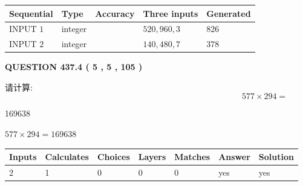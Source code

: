 \documentclass{ctexart}
\begin{document}
   
  
  
\noindent\begin{tabular}{|l|l|l|l|l|}
\hline
 Sequential & Type & Accuracy & Three inputs & Generated \\ 
\hline
 
 
  INPUT $  1 $ & integer &  & $
 520
 , 
 960
 , 
 3
 $ & $ 826 $ 
 \\  \hline  
 
 
  INPUT $  2 $ & integer &  & $
 140
 , 
 480
 , 
 7
 $ & $ 378 $ 
 \\  \hline  
 \end{tabular}
   
   
  
\vspace{0.2in}
  
{\textbf{\Large{QUESTION
437.4 
 ( 5 , 5 , 105 )
}}}
  
  
 
请计算:
\begin{equation}
577  \times    %
294 = \nonumber
\end{equation}
 
 
 
\noindent{}
 
 

169638
 
 
\noindent{}
 
 

 
 
 
\noindent{}
 
 

$ %
577 \times  %
294=   %
169638$
 
 
\noindent{}
 
 

 
   
   
   
   
\noindent\begin{tabular}{|l|l|l|l|l|l|l|}
 \hline
Inputs & Calculates & Choices & Layers & Matches & Answer & Solution \\ \hline
 2  & 
 1  & 
 0
  & 
 0  & 
 0  & 
  yes & 
  yes 
  \\ \hline
 \end{tabular}
   
\end{document}
